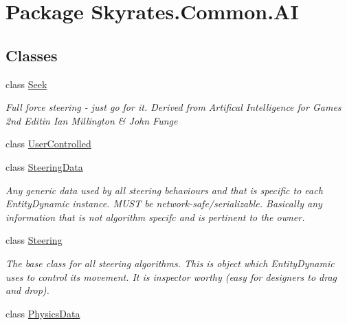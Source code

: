 \hypertarget{namespace_skyrates_1_1_common_1_1_a_i}{\section{Package Skyrates.\-Common.\-A\-I}
\label{namespace_skyrates_1_1_common_1_1_a_i}
}
\subsection*{Classes}
\begin{DoxyCompactItemize}
\item 
class \hyperlink{class_skyrates_1_1_common_1_1_a_i_1_1_seek}{Seek}
\begin{DoxyCompactList}\small\item\em Full force steering -\/ just go for it. Derived from Artifical Intelligence for Games 2nd Editin Ian Millington \& John Funge \end{DoxyCompactList}\item 
class \hyperlink{class_skyrates_1_1_common_1_1_a_i_1_1_user_controlled}{User\-Controlled}
\item 
class \hyperlink{class_skyrates_1_1_common_1_1_a_i_1_1_steering_data}{Steering\-Data}
\begin{DoxyCompactList}\small\item\em Any generic data used by all steering behaviours and that is specific to each Entity\-Dynamic instance. M\-U\-S\-T be network-\/safe/serializable. Basically any information that is not algorithm specifc and is pertinent to the owner. \end{DoxyCompactList}\item 
class \hyperlink{class_skyrates_1_1_common_1_1_a_i_1_1_steering}{Steering}
\begin{DoxyCompactList}\small\item\em The base class for all steering algorithms. This is object which Entity\-Dynamic uses to control its movement. It is inspector worthy (easy for designers to drag and drop). \end{DoxyCompactList}\item 
class \hyperlink{class_skyrates_1_1_common_1_1_a_i_1_1_physics_data}{Physics\-Data}
\end{DoxyCompactItemize}
